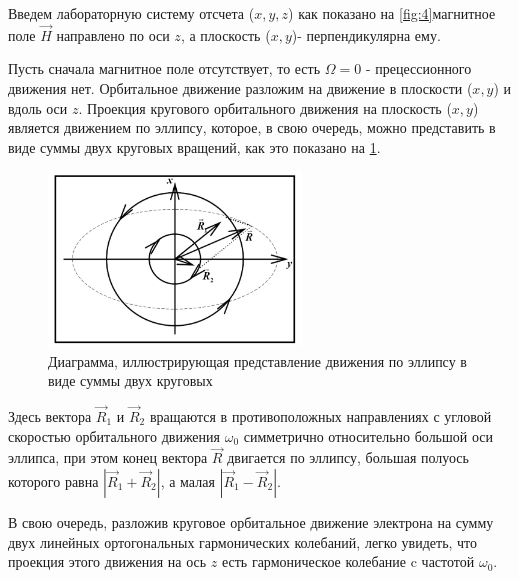 Введем лабораторную систему отсчета ($x, y, z$) как показано на \ref{fig:4}магнитное поле $\vec{H}$ направлено по оси $z$, а плоскость ($x, y$)- перпендикулярна ему. 

Пусть сначала магнитное поле отсутствует, то есть $\Omega = 0$ - прецессионного движения нет. Орбитальное движение разложим на движение в плоскости ($x, y$) и вдоль оси $z$. Проекция кругового орбитального движения на плоскость ($x, y$) является движением по эллипсу, которое, в свою очередь, можно представить в виде суммы двух круговых вращений, как это показано на \ref{fig:5}. 


\begin{figure}[tb]
	\centering
	\includegraphics[width=0.6\textwidth]{fig/fig5.jpg}
	\caption{Диаграмма, иллюстрирующая представление движения по эллипсу в виде суммы двух круговых}
	\label{fig:5}
\end{figure}

Здесь вектора $\vec{R}_1$ и $\vec{R}_2$ вращаются в противоположных направлениях с угловой скоростью орбитального движения $\omega_0$ симметрично относительно большой оси эллипса, при этом конец вектора $\vec{R}$ двигается по эллипсу, большая полуось которого равна $|\vec{R}_1 + \vec{R}_2|$, а малая $|\vec{R}_1 - \vec{R}_2|$.

В свою очередь, разложив круговое орбитальное движение электрона на сумму двух линейных ортогональных гармонических колебаний, легко увидеть, что проекция этого движения на ось $z$ есть гармоническое колебание c частотой $\omega_0$.

